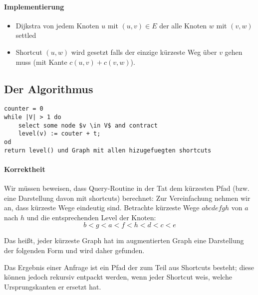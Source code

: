 \paragraph*{Implementierung}
\begin{itemize}
	\item Dijkstra von jedem Knoten $u$ mit $(u,v) \in E$ der alle Knoten $w$ mit $(v,w)$ settled
	\item Shortcut $(u,w)$ wird gesetzt falls der einzige kürzeste Weg über $v$ gehen muss (mit Kante $c(u,v)+c(v,w)$).
\end{itemize}

\subsection{Der Algorithmus}
\begin{lstlisting}[mathescape]
counter = 0
while |V| > 1 do
	select some node $v \in V$ and contract
	level(v) := couter + t;
od
return level() und Graph mit allen hizugefuegten shortcuts
\end{lstlisting}

\paragraph*{Korrektheit} Wir müssen beweisen, dass Query-Routine in der Tat dem kürzesten Pfad (bzw. eine Darstellung davon mit shortcuts) berechnet: Zur Vereinfachung nehmen wir an, dass kürzeste Wege eindeutig sind. Betrachte kürzeste Wege $abcdefgh$ von $a$ nach $h$ und die entsprechenden Level der Knoten: $$ b<g<a<f<h<d<c<e $$ %

\par\medskip
Das heißt, jeder kürzeste Graph hat im augmentierten Graph eine Darstellung der folgenden Form und wird daher gefunden.\par\medskip %

Das Ergebnis einer Anfrage ist ein Pfad der zum Teil aus Shortcuts besteht; diese können jedoch rekursiv entpackt werden, wenn jeder Shortcut weis, welche Ursprungskanten er ersetzt hat.\par\medskip